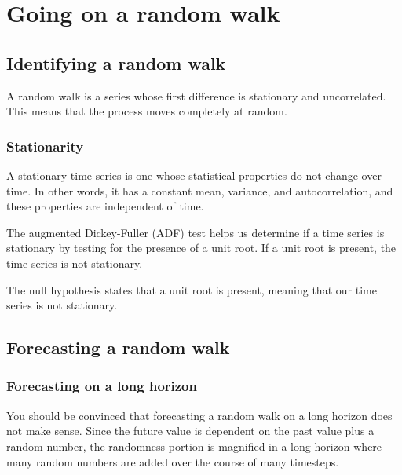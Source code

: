 \chapter{Going on a random walk\label{ch03}}
\section{Identifying a random walk}
\begin{definition}
    A random walk is a series whose first difference is stationary and uncorrelated. This means that the process moves completely at random.
\end{definition}
\subsection{Stationarity}
A stationary time series is one whose statistical properties do not change over time. In other words, it has a constant mean, variance, and autocorrelation, and these properties are independent of time.
\begin{tcolorbox}[title=Augmented Dickey-Fuller (ADF) test]
    The augmented Dickey-Fuller (ADF) test helps us determine if a time series is stationary by testing for the presence of a unit root. If a unit root is present, the time series is not stationary.

    The null hypothesis states that a unit root is present, meaning that our time series is not stationary.
\end{tcolorbox}
\section{Forecasting a random walk}
\subsection{Forecasting on a long horizon}
You should be convinced that forecasting a random walk on a long horizon does not make sense. Since the future value is dependent on the past value plus a random number, the randomness portion is magnified in a long horizon where many random numbers are added over the course of many timesteps.